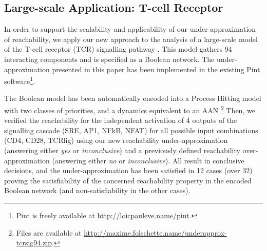 \subsection{Large-scale Application: T-cell Receptor}
\label{ssec:ex-tcrsig}

In order to support the scalability and applicability of our under-approximation of reachability, we
apply our new approach to the analysis of a large-scale model of the T-cell receptor (TCR)
signalling pathway \cite{tcrsig94}.
This model gathers 94 interacting components and is specified as a Boolean network.
The under-approximation presented in this paper has been implemented in the existing Pint
software\footnote{Pint is freely available at \url{http://loicpauleve.name/pint}.}.

The Boolean model has been automatically encoded into
a Process Hitting model with two classes of priorities,
and a dynamics equivalent to an AAN%
\footnote{Files are available at
\url{http://maxime.folschette.name/underapprox-tcrsig94.zip}.}
Then, we verified the reachability for the independent activation of 4 outputs of the signalling
cascade (SRE, AP1, NFkB, NFAT) for all possible input combinations (CD4, CD28, TCRlig) using our
new reachability under-approximation (answering either \emph{yes} or \emph{inconclusive}) and a 
previously defined reachability over-approximation \cite{PMR12-MSCS} (answering either \emph{no} or
\emph{inconclusive}).
All result in conclusive decisions, and the under-approximation has been satisfied in 12 cases (over
32) proving the satisfiability of the concerned reachability property in the encoded Boolean network
(and non-satisfiability in the other cases).


